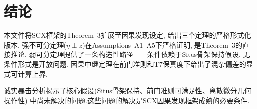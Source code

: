 \documentclass[12pt,a4paper]{article}
\begin{document}
\section{结论}
\label{sec:conclusion}

本文件将SCX框架的Theorem~3扩展至因果发现设定,
给出三个定理的严格形式化版本.
强不可分定理($\eta \perp z$)在Assumptions~A1--A5下严格证明,
是Theorem~3的直接推论.
弱可分定理提供了一条构造性路径——条件依赖于Situs骨架保持假设,
无条件形式是开放问题.
因果中继定理在前门准则和T7保真度下给出了混杂偏差的显式可计算上界.

诚实暴击分析揭示了核心假设(Situs骨架保持、前门准则可满足性、离散微分几何操作性)
中尚未解决的问题.这些问题的解决是SCX因果发现框架成熟的必要条件.
\end{document}
